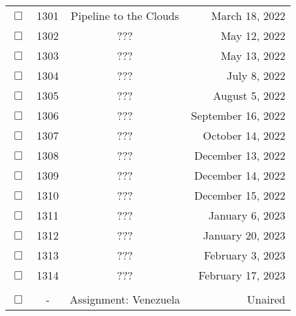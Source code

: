 \documentclass[12pt]{article}
\begin{document}
\begin{center}
\begin{longtable}[c]{cccr}
$\Box$&1301&Pipeline to the Clouds&March 18, 2022\\
$\Box$&1302&???&May 12, 2022\\
$\Box$&1303&???&May 13, 2022\\
$\Box$&1304&???&July 8, 2022\\
$\Box$&1305&???&August 5, 2022\\
$\Box$&1306&???&September 16, 2022\\
$\Box$&1307&???&October 14, 2022\\
$\Box$&1308&???&December 13, 2022\\
$\Box$&1309&???&December 14, 2022\\
$\Box$&1310&???&December 15, 2022\\
$\Box$&1311&???&January 6, 2023\\
$\Box$&1312&???&January 20, 2023\\
$\Box$&1313&???&February 3, 2023\\
$\Box$&1314&???&February 17, 2023\\

\\  %
$\Box$&-&Assignment: Venezuela&Unaired\\
\end{longtable}\end{center}
\end{document}
